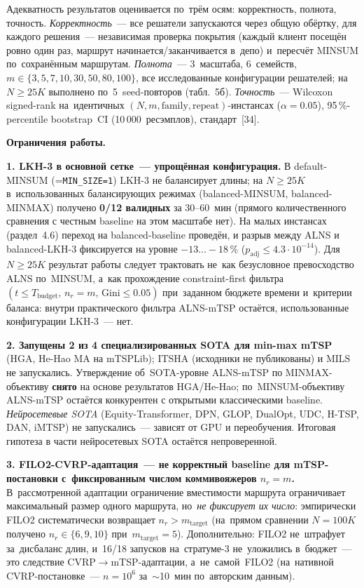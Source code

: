 \documentclass[a4paper,14pt]{extreport}
\makeatletter
\let\old@texttt\texttt
\renewcommand{\texttt}[1]{{\sloppy\hyphenchar\font=\m@ne\old@texttt{#1}}}
\makeatother
\begin{document}
Адекватность результатов оценивается по~трём осям: корректность, полнота, точность. \emph{Корректность}~--- все решатели запускаются через общую обёртку, для каждого решения~--- независимая проверка покрытия (каждый клиент посещён ровно один раз, маршрут начинается/заканчивается в~депо) и~пересчёт MINSUM по~сохранённым маршрутам. \emph{Полнота}~--- 3~масштаба, 6~семейств, $m\in\{3,5,7,10,30,50,80,100\}$, все исследованные конфигурации решателей; на~$N\geq 25K$ выполнено по~5~seed-повторов (табл.~5б). \emph{Точность}~--- Wilcoxon signed-rank на~идентичных $(N,m,\text{family},\text{repeat})$-инстансах ($\alpha=0.05$), 95\,\%-percentile bootstrap~CI (10\,000~ресэмплов), стандарт~[34].

\textbf{Ограничения работы.}

\textbf{1. LKH-3 в основной сетке~--- упрощённая конфигурация.} В default-MINSUM (\texttt{MIN\_SIZE=1}) LKH-3 не балансирует длины; на $N\geq 25K$ в~использованных балансирующих режимах (balanced-MINSUM, balanced-MINMAX) получено \textbf{0/12 валидных} за 30--60~мин (прямого количественного сравнения с честным baseline на этом масштабе нет). На малых инстансах (раздел~4.6) переход на balanced-baseline проведён, и разрыв между ALNS и balanced-LKH-3 фиксируется на уровне $-13\dots-18\,\%$ ($p_\mathrm{adj}\leq 4.3{\cdot}10^{-14}$). Для $N\geq 25K$ результат работы следует трактовать не~как безусловное превосходство ALNS по~MINSUM, а~как прохождение constraint-first фильтра $(t\leq T_\mathrm{budget},\,n_r=m,\,\mathrm{Gini}\leq 0.05)$ при~заданном бюджете времени и~критерии баланса: внутри практического фильтра ALNS-mTSP остаётся, использованные конфигурации LKH-3~--- нет.

\textbf{2. Запущены 2 из 4 специализированных SOTA для min-max mTSP} (HGA, He-Hao MA на mTSPLib); ITSHA (исходники не публикованы) и MILS не запускались. Утверждение об~SOTA-уровне ALNS-mTSP по MINMAX-объективу \textbf{снято} на основе результатов HGA/He-Hao; по~MINSUM-объективу ALNS-mTSP остаётся конкурентен с открытыми классическими baseline. \emph{Нейросетевые SOTA} (Equity-Transformer, DPN, GLOP, DualOpt, UDC, H-TSP, DAN, iMTSP) не запускались~--- зависят от GPU и переобучения. Итоговая гипотеза в части нейросетевых SOTA остаётся непроверенной.

\textbf{3. FILO2-CVRP-адаптация~--- не корректный baseline для mTSP-постановки с~фиксированным числом коммивояжеров $n_r=m$.} В~рассмотренной адаптации ограничение вместимости маршрута ограничивает максимальный размер одного маршрута, но~\emph{не фиксирует их число}: эмпирически FILO2 систематически возвращает $n_r>m_\mathrm{target}$ (на~прямом сравнении $N=100K$ получено $n_r\in\{6,9,10\}$ при~$m_\mathrm{target}=5$). Дополнительно: FILO2 не~штрафует за~дисбаланс длин, и~16/18 запусков на~стратуме-3 не~уложились в~бюджет~--- это следствие CVRP$\to$mTSP-адаптации, а~не~самой~FILO2 (на~нативной CVRP-постановке~--- $n=10^6$ за~$\sim$10~мин по~авторским данным).
\end{document}
